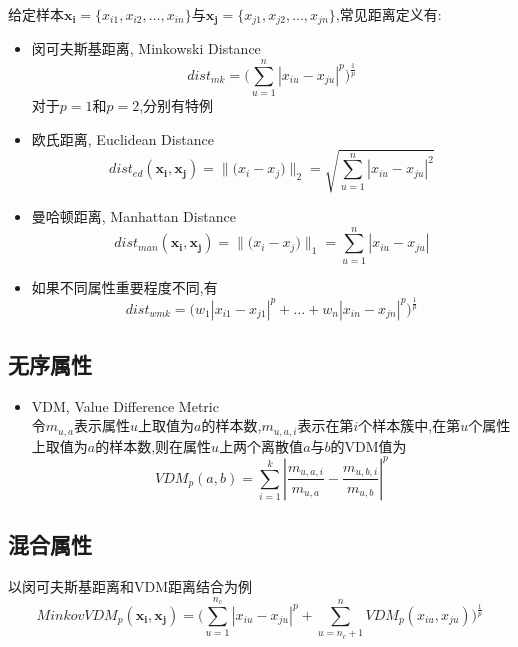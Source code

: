 给定样本$\mathbf{x_i}=\{x_{i1},x_{i2},\dots,x_{in}\}$与$\mathbf{x_j}=\{x_{j1},x_{j2},\dots,x_{jn}\}$,常见距离定义有:
\begin{itemize}
\item 闵可夫斯基距离, Minkowski Distance
    \begin{equation}
    dist_{mk}=\Big(\sum_{u=1}^n|x_{iu}-x_{ju}|^p\Big)^{\frac{1}{p}}
    \end{equation}
对于$p=1$和$p=2$,分别有特例
\item 欧氏距离, Euclidean Distance
    \begin{equation}
    dist_{ed}(\mathbf{x_i, x_j})=\|\mathbf(x_i-x_j)\|_2=\sqrt{\sum_{u=1}^n|x_{iu}-x_{ju}|^2}
    \end{equation}
\item 曼哈顿距离, Manhattan Distance
    \begin{equation}
    dist_{man}(\mathbf{x_i, x_j})=\|\mathbf(x_i-x_j)\|_1=\sum_{u=1}^n|x_{iu}-x_{ju}|
    \end{equation}
\item 如果不同属性重要程度不同,有
    \begin{equation}
    dist_{wmk}=\Big(w_1|x_{i1}-x_{j1}|^p+\dots+w_n|x_{in}-x_{jn}|^p\Big)^{\frac{1}{p}}
    \end{equation}
\end{itemize}

\subsection*{无序属性}

\begin{itemize}
\item VDM, Value Difference Metric\\
令$m_{u,a}$表示属性$u$上取值为$a$的样本数,$m_{u,a,i}$表示在第$i$个样本簇中,在第$u$个属性上取值为$a$的样本数,则在属性$u$上两个离散值$a$与$b$的VDM值为
    \begin{equation}
    VDM_p(a,b)=\sum_{i=1}^k|\frac{m_{u,a,i}}{m_{u,a}}-\frac{m_{u,b,i}}{m_{u,b}}|^p
    \end{equation}
\end{itemize}

\subsection*{混合属性}

以闵可夫斯基距离和VDM距离结合为例
\begin{equation}
MinkovVDM_p(\mathbf{x_i,x_j})=\Big(\sum_{u=1}^{n_c}|x_{iu}-x_{ju}|^p+\sum_{u=n_c+1}^nVDM_p(x_{iu},x_{ju})\Big)^{\frac{1}{p}}
\end{equation}

